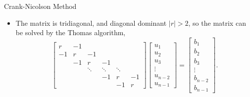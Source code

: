 \documentclass{beamer}
\begin{document}
\begin{frame}{Crank-Nicolson Method}
    \begin{itemize}
        \item The matrix is tridiagonal, and diagonal dominant $|r|>2$, so the matrix can be solved by 
        the Thomas algorithm,
        $$
\left[\begin{array}{rrrrrr}
r & -1 & & & & \\
-1 & r & -1 & & & \\
& -1 & r & -1 & & \\
& & \ddots & \ddots & \ddots & \\
& & & -1 & r & -1 \\
& & & & -1 & r
\end{array}\right]\left[\begin{array}{c}
u_1 \\
u_2 \\
u_3 \\
\vdots \\
u_{n-2} \\
u_{n-1}
\end{array}\right]=\left[\begin{array}{c}
b_1 \\
b_2 \\
b_3 \\
\vdots \\
b_{n-2} \\
b_{n-1}
\end{array}\right].
$$
    \end{itemize}
\end{frame}
\end{document}
